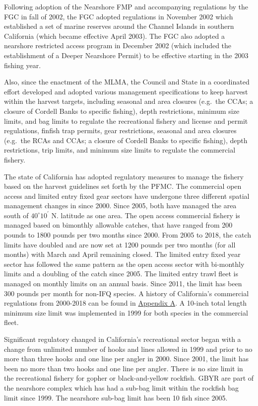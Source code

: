 \documentclass[12pt,]{article}
\begin{document}
Following adoption of the Nearshore FMP and accompanying regulations by
the FGC in fall of 2002, the FGC adopted regulations in November 2002
which established a set of marine reserves around the Channel Islands in
southern California (which became effective April 2003). The FGC also
adopted a nearshore restricted access program in December 2002 (which
included the establishment of a Deeper Nearshore Permit) to be effective
starting in the 2003 fishing year.

Also, since the enactment of the MLMA, the Council and State in a
coordinated effort developed and adopted various management
specifications to keep harvest within the harvest targets, including
seasonal and area closures (e.g.~the CCAs; a closure of Cordell Banks to
specific fishing), depth restrictions, minimum size limits, and bag
limits to regulate the recreational fishery and license and permit
regulations, finfish trap permits, gear restrictions, seasonal and area
closures (e.g.~the RCAs and CCAs; a closure of Cordell Banks to specific
fishing), depth restrictions, trip limits, and minimum size limits to
regulate the commercial fishery.

The state of California has adopted regulatory measures to manage the
fishery based on the harvest guidelines set forth by the PFMC. The
commercial open access and limited entry fixed gear sectors have
undergone three different spatial management changes in since 2000.
Since 2005, both have managed the area south of \(40^\circ 10^\prime\)
N. latitude as one area. The open access commercial fishery is managed
based on bimonthly allowable catches, that have ranged from 200 pounds
to 1800 pounds per two months since 2000. From 2005 to 2018, the catch
limits have doubled and are now set at 1200 pounds per two months (for
all months) with March and April remaining closed. The limited entry
fixed year sector has followed the same pattern as the open access
sector with bi-monthly limits and a doubling of the catch since 2005.
The limited entry trawl fleet is managed on monthly limits on an annual
basis. Since 2011, the limit has been 300 pounds per month for non-IFQ
species. A history of California's commercial regulations from 2000-2018
can be found in
\protect\hyperlink{appendix-a.-californias-commercial-fishery-regulations}{Appendix
A}. A 10-inch total length minimum size limit was implemented in 1999
for both species in the commercial fleet.

Significant regulatory changed in California's recreational sector began
with a change from unlimited number of hooks and lines allowed in 1999
and prior to no more than three hooks and one line per angler in 2000.
Since 2001, the limit has been no more than two hooks and one line per
angler. There is no size limit in the recreational fishery for gopher or
black-and-yellow rockfish. GBYR are part of the nearshore complex which
has had a sub-bag limit within the rockfish bag limit since 1999. The
nearshore sub-bag limit has been 10 fish since 2005.
\end{document}
